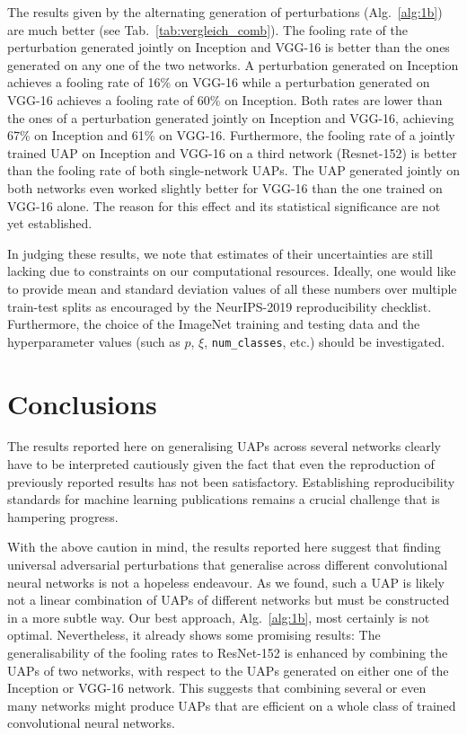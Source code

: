 \documentclass[runningheads]{llncs}
\begin{document}
The results given by the alternating generation of perturbations (Alg.~\ref{alg:1b}) are much better (see Tab.~\ref{tab:vergleich_comb}). The fooling rate of the perturbation generated jointly on Inception and VGG-16 is better than the ones generated on any one of the 
two networks. A perturbation generated on Inception achieves a fooling rate of 16\% on VGG-16 while a perturbation generated on VGG-16 achieves a fooling rate of 60\% on Inception. Both rates are lower than the ones of a perturbation generated jointly on Inception and VGG-16, achieving 67\% on Inception and 61\% on VGG-16. Furthermore, the fooling rate of a jointly trained UAP on Inception and VGG-16 on a third network (Resnet-152) is better than the fooling rate of both single-network UAPs. The UAP generated jointly on both networks even worked slightly better for VGG-16 than the one trained on VGG-16 alone. The reason for this effect and its statistical significance are not yet established. 

In judging these results, we note that estimates of their uncertainties are still lacking due to constraints on our computational resources. Ideally, one would like to provide mean and standard deviation values of all these numbers over multiple train-test splits as encouraged by the NeurIPS-2019 reproducibility checklist. Furthermore, the choice of the ImageNet training and testing data and the hyperparameter values (such as $p$, $\xi$, \texttt{num\_classes}, etc.) should be investigated. 

\section{Conclusions}\label{sec:conclusion}
The results reported here on generalising UAPs across several networks clearly have to be interpreted cautiously given the fact that even the reproduction of previously reported results has not been satisfactory. Establishing reproducibility standards for machine learning publications remains a crucial challenge that is hampering progress.

With the above caution in mind, the results reported here suggest that finding universal adversarial perturbations that generalise across different convolutional neural networks is not a hopeless endeavour. As we found, such a UAP is likely not a linear combination of UAPs of different networks but must be constructed in a more subtle way. Our best approach, Alg.~\ref{alg:1b}, most certainly is not optimal. Nevertheless, it already shows some promising results: The generalisability of the fooling rates to ResNet-152 is enhanced by combining the UAPs of two networks, with respect to the UAPs generated on either one of the Inception or VGG-16 network. This suggests that combining several or even many networks might produce UAPs that are efficient on a whole class of trained 
convolutional neural networks.


\end{document}
